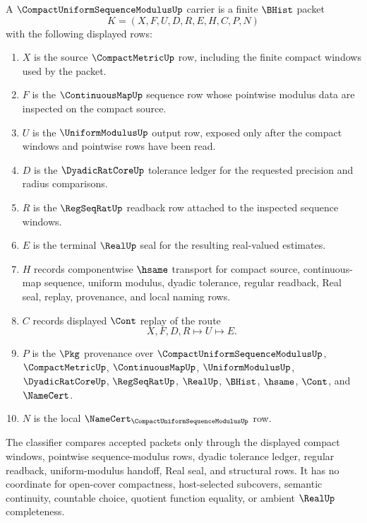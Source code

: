 \begin{definition}
\label{def:compact-uniform-sequence-modulus-carrier}
A $\CompactUniformSequenceModulusUp$ carrier is a finite $\BHist$ packet
$$
K=(X,F,U,D,R,E,H,C,P,N)
$$
with the following displayed rows:
\begin{enumerate}
\item $X$ is the source $\CompactMetricUp$ row, including the finite compact windows used by the packet.
\item $F$ is the $\ContinuousMapUp$ sequence row whose pointwise modulus data are inspected on the compact source.
\item $U$ is the $\UniformModulusUp$ output row, exposed only after the compact windows and pointwise rows have been read.
\item $D$ is the $\DyadicRatCoreUp$ tolerance ledger for the requested precision and radius comparisons.
\item $R$ is the $\RegSeqRatUp$ readback row attached to the inspected sequence windows.
\item $E$ is the terminal $\RealUp$ seal for the resulting real-valued estimates.
\item $H$ records componentwise $\hsame$ transport for compact source, continuous-map sequence, uniform modulus, dyadic tolerance, regular readback, Real seal, replay, provenance, and local naming rows.
\item $C$ records displayed $\Cont$ replay of the route
$$
X,F,D,R \longmapsto U \longmapsto E .
$$
\item $P$ is the $\Pkg$ provenance over $\CompactUniformSequenceModulusUp$, $\CompactMetricUp$, $\ContinuousMapUp$, $\UniformModulusUp$, $\DyadicRatCoreUp$, $\RegSeqRatUp$, $\RealUp$, $\BHist$, $\hsame$, $\Cont$, and $\NameCert$.
\item $N$ is the local $\NameCert_{\CompactUniformSequenceModulusUp}$ row.
\end{enumerate}
The classifier compares accepted packets only through the displayed compact windows, pointwise sequence-modulus rows, dyadic tolerance ledger, regular readback, uniform-modulus handoff, Real seal, and structural rows. It has no coordinate for open-cover compactness, host-selected subcovers, semantic continuity, countable choice, quotient function equality, or ambient $\RealUp$ completeness.
\end{definition}

